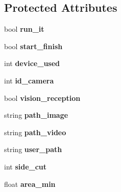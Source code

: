 \subsection*{Protected Attributes}
\begin{DoxyCompactItemize}
\item 
bool {\bfseries run\+\_\+it}\hypertarget{classvision_aecb99ce2062a83e281a516779bc38e66}{}\label{classvision_aecb99ce2062a83e281a516779bc38e66}

\item 
bool {\bfseries start\+\_\+finish}\hypertarget{classvision_a4bf6d1ad7886c368201f01d68cd87960}{}\label{classvision_a4bf6d1ad7886c368201f01d68cd87960}

\item 
int {\bfseries device\+\_\+used}\hypertarget{classvision_a4489e26964fedb334f8a11323974d1a5}{}\label{classvision_a4489e26964fedb334f8a11323974d1a5}

\item 
int {\bfseries id\+\_\+camera}\hypertarget{classvision_aed0670889f7380c81cb3c6a9b0783399}{}\label{classvision_aed0670889f7380c81cb3c6a9b0783399}

\item 
bool {\bfseries vision\+\_\+reception}\hypertarget{classvision_a33c98ec05332bc5c29cb59b7aec7cbe9}{}\label{classvision_a33c98ec05332bc5c29cb59b7aec7cbe9}

\item 
string {\bfseries path\+\_\+image}\hypertarget{classvision_a1c8c4864b8690f6146e2d383a0e26f8a}{}\label{classvision_a1c8c4864b8690f6146e2d383a0e26f8a}

\item 
string {\bfseries path\+\_\+video}\hypertarget{classvision_a277365a0346f8f7e8abfcd5dea190706}{}\label{classvision_a277365a0346f8f7e8abfcd5dea190706}

\item 
string {\bfseries user\+\_\+path}\hypertarget{classvision_abbd9a3ba6fc679b8e22b690ac30da88b}{}\label{classvision_abbd9a3ba6fc679b8e22b690ac30da88b}

\item 
int {\bfseries side\+\_\+cut}\hypertarget{classvision_ae465726320ce212e6d9ba02c98183a4c}{}\label{classvision_ae465726320ce212e6d9ba02c98183a4c}

\item 
float {\bfseries area\+\_\+min}\hypertarget{classvision_a394274c0683ad061464939b117ef8a34}{}\label{classvision_a394274c0683ad061464939b117ef8a34}


\end{DoxyCompactItemize}
